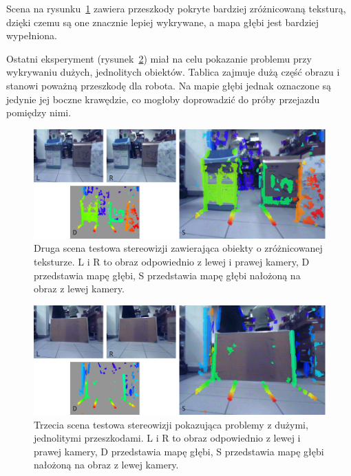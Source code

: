 Scena na rysunku~\ref{fig:stereo_2} zawiera przeszkody pokryte bardziej zróżnicowaną
teksturą, dzięki czemu są one znacznie lepiej wykrywane, a mapa głębi jest bardziej
wypełniona.

Ostatni eksperyment (rysunek~\ref{fig:stereo_3}) miał na celu pokazanie problemu
przy wykrywaniu dużych, jednolitych obiektów. Tablica zajmuje dużą część obrazu
i stanowi poważną przeszkodę dla robota. Na mapie głębi jednak oznaczone są jedynie
jej boczne krawędzie, co mogłoby doprowadzić do próby przejazdu pomiędzy nimi.

\begin{figure}[h!]
\centering
\includegraphics[width=\columnwidth]{../img/stereo_2}
\caption[Druga scena testowa stereowizji]{Druga scena testowa stereowizji zawierająca obiekty o zróżnicowanej teksturze. L i R to obraz odpowiednio z lewej i prawej kamery, D przedstawia mapę głębi, S przedstawia mapę głębi nałożoną na obraz z lewej kamery.}
\label{fig:stereo_2}
\end{figure}

\begin{figure}[h!]
\centering
\includegraphics[width=\columnwidth]{../img/stereo_3}
\caption[Trzecia scena testowa stereowizji]{Trzecia scena testowa stereowizji pokazująca problemy z dużymi, jednolitymi przeszkodami. L i R to obraz odpowiednio z lewej i prawej kamery, D przedstawia mapę głębi, S przedstawia mapę głębi nałożoną na obraz z lewej kamery.}
\label{fig:stereo_3}
\end{figure}

